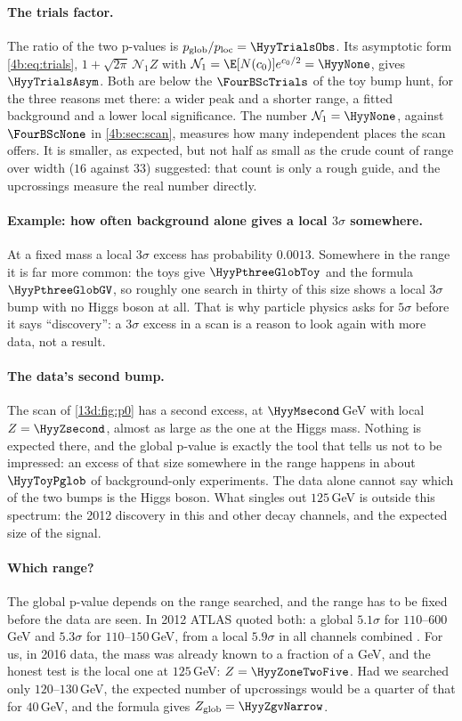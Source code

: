 \paragraph{The trials factor.}
The ratio of the two p-values is $p_{\rm glob}/p_{\rm loc}=\HyyTrialsObs$. Its asymptotic
form \eqref{4b:eq:trials}, $1+\sqrt{2\pi}\,\mathcal N_1Z$ with
$\mathcal N_1=\E[N(c_0)]e^{c_0/2}=\HyyNone$, gives $\HyyTrialsAsym$. Both are below the
$\FourBScTrials$ of the toy bump hunt, for the three reasons met there: a wider peak and a shorter range, a
fitted background and a lower local significance. The number $\mathcal N_1=\HyyNone$, against $\FourBScNone$ in \cref{4b:sec:scan},
measures how many independent places the scan offers. It is smaller, as expected, but
not half as small as the crude count of range over width ($16$ against $33$) suggested:
that count is only a rough guide, and the upcrossings measure the real number directly.

\paragraph{Example: how often background alone gives a local $3\sigma$ somewhere.}
At a fixed mass a local $3\sigma$ excess has probability $0.0013$. Somewhere in the range
it is far more common: the toys give $\HyyPthreeGlobToy$ and the formula
$\HyyPthreeGlobGV$, so roughly one search in thirty of this size shows a
local $3\sigma$ bump with no Higgs boson at all. That is why particle physics asks
for $5\sigma$ before it says ``discovery'': a $3\sigma$ excess in a scan is a reason to
look again with more data, not a result.

\paragraph{The data's second bump.}
The scan of \cref{13d:fig:p0} has a second excess, at $\HyyMsecond\,$GeV with local
$Z=\HyyZsecond$, almost as large as the one at the Higgs mass. Nothing is expected there,
and the global p-value is exactly the tool that tells us not to be impressed: an excess of
that size somewhere in the range happens in about $\HyyToyPglob$ of background-only
experiments. The data alone cannot say which of the two bumps is the Higgs boson. What
singles out $125\,$GeV is outside this spectrum: the 2012 discovery in this and other decay
channels, and the expected size of the signal.

\paragraph{Which range?}
The global p-value depends on the range searched, and the range has to be fixed before
the data are seen. In 2012 ATLAS quoted both: a global $5.1\sigma$ for
$110$--$600\,$GeV and $5.3\sigma$ for $110$--$150\,$GeV, from a local $5.9\sigma$ in all
channels combined . For us, in 2016 data, the mass was already
known to a fraction of a GeV, and the honest test is the local one at $125\,$GeV:
$Z=\HyyZoneTwoFive$. Had we searched only $120$--$130\,$GeV, the expected number of
upcrossings would be a quarter of that for $40\,$GeV, and the formula gives
$Z_{\rm glob}=\HyyZgvNarrow$.

